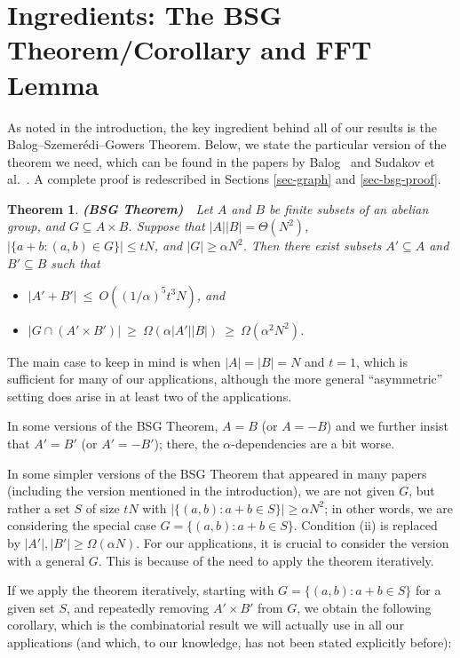 \documentclass[11pt]{article}
\newcommand{\LONG}[1]{#1}\newcommand{\SHORT}[1]{}
\newtheorem{theorem}{Theorem}[section]
\begin{document}
\section{Ingredients: The BSG Theorem/Corollary
and FFT Lemma}\label{sec:bsg}


As noted in the introduction,
the key ingredient behind all of our results is the Balog--Szemer\'edi--Gowers Theorem.  Below,
we state the particular version of the theorem we need, which can be found
in the papers by Balog~\cite{Balog07} and Sudakov et al.~\cite{SSV94}.  A complete proof is redescribed in
\LONG{Sections \ref{sec-graph} and \ref{sec-bsg-proof}}\SHORT{the full paper}.

\begin{theorem} {\bf(BSG Theorem)}\ \ Let $A$ and $B$ be finite subsets of an abelian group, and $G\subseteq A \times B$.
  Suppose that $|A||B|=\Theta(N^2)$, $|\{a+b: (a,b)\in G\}| \le tN$, and $|G| \ge \alpha N^2$.
  Then there exist subsets $A'\subseteq A$ and $B'\subseteq B$ such that

\begin{itemize}
\item[\rm (i)]   $|A' + B'| \:\leq\:  O((1/\alpha)^5 t^3 N)$, and
\item[\rm (ii)]  $|G\cap (A'\times B')| \:\geq\:
\Omega(\alpha |A'||B|) \:\geq\: \Omega(\alpha^2 N^2)$.
\end{itemize}
\end{theorem}

The main case to keep in mind is when $|A|=|B|=N$ and $t=1$,
which is sufficient for many of our applications, although the
more general ``asymmetric'' setting does arise in at least two of the
applications.

In some versions of the BSG Theorem,
$A=B$ (or $A=-B$) and we further insist that $A'=B'$ (or $A'=-B'$); there, the $\alpha$-dependencies are a bit worse.

In some simpler versions of the BSG Theorem that appeared in many papers (including the version mentioned in the introduction), we are not given $G$,
but rather a set $S$ of size $tN$ with $|\{(a,b):a+b\in S\}|\ge
\alpha N^2$; in other words, we are considering the special case $G=\{(a,b):a+b\in S\}$.  Condition (ii) is replaced by
$|A'|,|B'|\ge\Omega(\alpha N)$.
For our applications, it is crucial to consider the version with
a general $G$.  This is because of the need to apply the
theorem iteratively.

If we apply the theorem iteratively, starting with
$G = \{(a,b): a+b\in S\}$ for a given set $S$, and repeatedly removing
$A' \times B'$ from $G$, we obtain the following corollary, which
is the combinatorial result we will actually use in all our applications
(and which, to our knowledge, has not been stated explicitly before):
\end{document}
